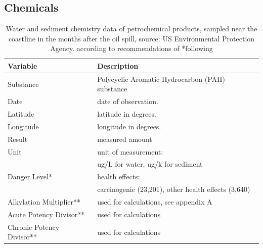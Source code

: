\documentclass[authoryear,12pt]{elsarticle}
\begin{document}
\subsection{Chemicals}

\begin{table}
\begin{tabular}{lp{9.5cm}}\hline
\bf Variable & \bf Description \\\hline
Substance & Polycyclic Aromatic Hydrocarbon (PAH) substance \\
Date & date of observation.\\
Latitude & latitude in degrees. \\
Longitude & longitude in degrees. \\
Result &  measured amount \\
Unit &  unit of measurement: \\
& {\small ug/L for water, ug/k for sediment} \\
Danger Level* &  health effects:\\
& {\small carcinogenic (23,201), other health effects (3,640)} \\
Alkylation Multiplier** & used for calculations, see appendix A \\
Acute Potency Divisor** & used for calculations\\
Chronic Potency Divisor** & used for calculations \\\hline
\end{tabular}
\label{table.chemicals}
\caption{Water and sediment chemistry data of petrochemical products, sampled near the coastline in the months after the oil spill, source: US Environmental  Protection Agency.\newline
{\small *according to recommendations of \citet{pah-danger}}\newline
{\small **following \citet{pah-benchmark}} }
\end{table}
\end{document}
